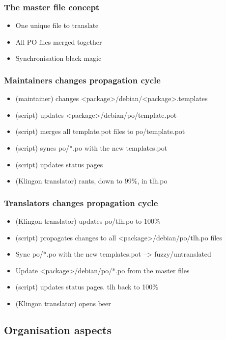 \documentclass{beamer}
\begin{document}
\begin{frame}
  \frametitle{The master file concept}
	\begin{itemize}
	\item
		One unique file to translate
	\item
		All PO files merged together
	\item
		Synchronisation black magic
	\end{itemize}
\end{frame}

\begin{frame}
  \frametitle{Maintainers changes propagation cycle}
	\begin{itemize}
	\item
		(maintainer) changes <package>/debian/<package>.templates
	\item
		(script) updates <package>/debian/po/template.pot
	\item
		(script) merges all template.pot files to po/template.pot
	\item
		(script) syncs po/*.po with the new templates.pot
	\item
		(script) updates status pages
	\item
		(Klingon translator) rants, down to 99\%, in tlh.po
	\end{itemize}
\end{frame}

\begin{frame}
  \frametitle{Translators changes propagation cycle}
	\begin{itemize}
	\item
		(Klingon translator) updates po/tlh.po to 100\%
	\item
		(script) propagates changes to all <package>/debian/po/tlh.po files	\item
		Sync po/*.po with the new templates.pot --> fuzzy/untranslated
	\item
		Update <package>/debian/po/*.po from the master files

	\item
		(script) updates status pages. tlh back to 100\%
	\item
		(Klingon translator) opens beer
	\end{itemize}
\end{frame}

\subsection{Organisation aspects}
\end{document}
